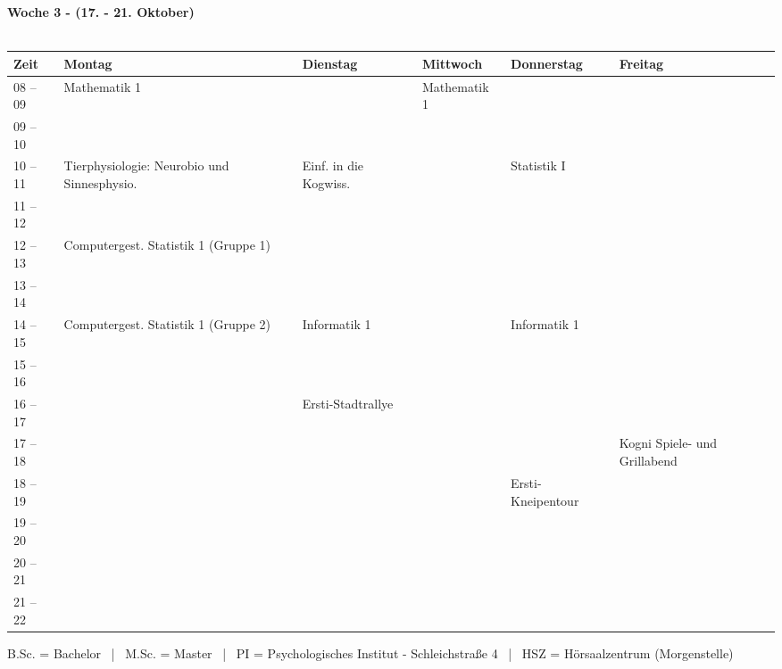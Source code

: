 \textbf{Woche 3 - (17. - 21. Oktober)}\\
\\
\begin{tabular}{|l|p{}|p{}|p{}|p{}|p{}|} \hline
	Zeit & Montag & Dienstag & Mittwoch & Donnerstag & Freitag \\ 
	\hline \hline
 08 -- 09 & \footnotesize{Mathematik 1} & & \footnotesize{Mathematik 1} & & \\ \cline{1-1}
 09 -- 10 & & & & & \\ \cline{1-5}
 10 -- 11 & \footnotesize{Tierphysiologie: Neurobio und Sinnesphysio.} & \footnotesize{Einf. in die Kogwiss.} & & \footnotesize{Statistik I} & \\ \cline{1-1} 
 11 -- 12 &  &  & &  & \\ \hline
 12 -- 13 & \footnotesize{Computergest. Statistik 1 (Gruppe 1)}& & & & \\ \cline{1-1}
 13 -- 14 & & & & & \\ \hline
 14 -- 15 & \footnotesize{Computergest. Statistik 1 (Gruppe 2)} & \footnotesize{Informatik 1} & & \footnotesize{Informatik 1} & \\  \cline {1-1}
 15 -- 16 & &  & & & \\ \hline
 16 -- 17 & & \scriptsize{Ersti-Stadtrallye} \cellcolor{lightlightgray} & & & \\ \cline{1-1}
 17 -- 18 & & \cellcolor{lightlightgray}& & & \scriptsize{Kogni Spiele- und Grillabend} \cellcolor{lightlightgray}\\ \cline{1-1} \cline{4-5}
 18 -- 19 & & \cellcolor{lightlightgray} & & \scriptsize{Ersti-Kneipentour} \cellcolor{lightlightgray}&  \cellcolor{lightlightgray}\\ \cline{1-1}
 19 -- 20 & & \cellcolor{lightlightgray} & & \cellcolor{lightlightgray} & \cellcolor{lightlightgray}\\ \cline{1-1}
 20 -- 21 & & & &  \cellcolor{lightlightgray}& \cellcolor{lightlightgray}\\ \cline{1-1}
 21 -- 22 & & & &  \cellcolor{lightlightgray}& \cellcolor{lightlightgray}\\ \hline
\end{tabular}

\scriptsize{B.Sc. = Bachelor ~|~ M.Sc. = Master ~|~ PI = Psychologisches Institut - Schleichstraße 4 ~|~ HSZ = Hörsaalzentrum (Morgenstelle)}

